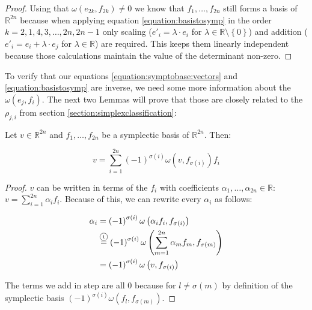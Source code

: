 \documentclass[../SymplecticSimplices.tex]{subfiles}
\begin{document}
\begin{proof}
  Using that \( \omega \left( e_{2k}, f_{2k} \right) \neq 0 \) we know that \( f_1, \dots, f_{2n} \) still forms a basis of \( \mathbb{R}^{2n} \) because when applying equation \eqref{equation:basistosymp} in the order \( k = 2, 1, 4, 3, \dots, 2n, 2n-1 \) only scaling (\( e'_i = \lambda \cdot e_i \) for \( \lambda \in \mathbb{R} \setminus \left\lbrace 0 \right\rbrace \)) and addition (\( e'_i = e_i + \lambda \cdot e_j\) for \(  \lambda \in \mathbb{R} \)) are required. This keeps them linearly independent because those calculations maintain the value of the determinant non-zero.
\end{proof}

To verify that our equations \eqref{equation:symptobase:vectors} and \eqref{equation:basistosymp} are inverse, we need some more information about the \( \omega \left( e_j, f_i \right) \). The next two Lemmas will prove that those are closely related to the \( \rho_{j,i} \) from section \ref{section:simplexclassification}:

\begin{lemma}
  \label{lemma:displayinsymplecticbasis}
  Let \( v \in \mathbb{R}^{2n} \) and \( f_1, \dots, f_{2n} \) be a symplectic basis of \( \mathbb{R}^{2n} \). Then:

  \[ v = \sum \limits _{i = 1} ^{2n} \left( -1 \right)^{\sigma \left( i \right)} \omega \left( v, f_{\sigma \left( i \right)} \right) f_i \]
\end{lemma}

\begin{proof}
  \( v \) can be written in terms of the \( f_i \) with coefficients \( \alpha_{1}, \dots, \alpha_{2n} \in \mathbb{R} \): \( v = \sum _{i = 1} ^{2n} \alpha_{i} f_i \). Because of this, we can rewrite every \( \alpha_i \) as follows:

  \begin{equation*}
    \begin{split}
      \alpha_i & = \left( -1 \right)^{\sigma \left( i \right)} \omega \left( \alpha_i f_i, f_{\sigma \left( i \right)} \right) \\
               & \eqcom{1} \left( -1 \right)^{\sigma \left( i \right)} \omega \left( \sum \limits _{m = 1} ^{2n} \limits \alpha_{m} f_m, f_{\sigma \left( m \right)} \right) \\
               & = \left( -1 \right)^{\sigma \left( i \right)} \omega \left( v, f_{\sigma \left( i \right)} \right)
    \end{split}
  \end{equation*}

  The terms we add in step  are all \( 0 \) because for \( l \neq \sigma \left( m \right) \) by definition of the symplectic basis \( \left( -1 \right)^{\sigma \left( i \right)} \omega \left( f_l, f_{\sigma \left( m \right)} \right) \).
\end{proof}
\end{document}
